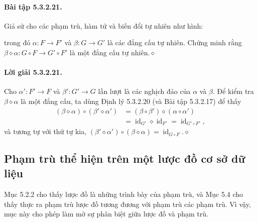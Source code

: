 \paragraph{Bài tập 5.3.2.21.} Giả sử cho các phạm trù, hàm tử và biến đổi tự nhiên như hình:
\begin{center}\end{center}
trong đó $\alpha:F\to F'$ và $\beta:G\to G'$ là các đẳng cấu tự nhiên. Chứng minh rằng $\beta\diamond\alpha:G\circ F\to G'\circ F'$ là một đẳng cấu tự nhiên.\hfill$\diamond$
\paragraph{Lời giải 5.3.2.21.} Cho $\alpha':F'\to F$ và $\beta':G'\to G$ lần lượt là các nghịch đảo của $\alpha$ và $\beta$. Để kiểm tra $\beta\diamond\alpha$ là một đẳng cấu, ta dùng Định lý 5.3.2.20 (và Bài tập 5.3.2.17) để thấy
\[\begin{aligned}(\beta\diamond\alpha)\circ(\beta'\diamond\alpha')
&=(\beta\circ\beta')\diamond(\alpha\circ\alpha')\\
&=\operatorname{id}_{G'}\diamond\operatorname{id}_{F'}=\operatorname{id}_{G'\circ F'},
\end{aligned}\]
và tương tự với thứ tự kia, $(\beta'\diamond\alpha')\circ(\beta\diamond\alpha)=\operatorname{id}_{G\circ F}$.\hfill$\diamond$
\subsection{Phạm trù thể hiện trên một lược đồ cơ sở dữ liệu}
Mục 5.2.2 cho thấy lược đồ là những trình bày của phạm trù, và Mục 5.4 cho thấy thực ra phạm trù lược đồ tương đương với phạm trù các phạm trù. Vì vậy, mục này cho phép làm mờ sự phân biệt giữa lược đồ và phạm trù.

